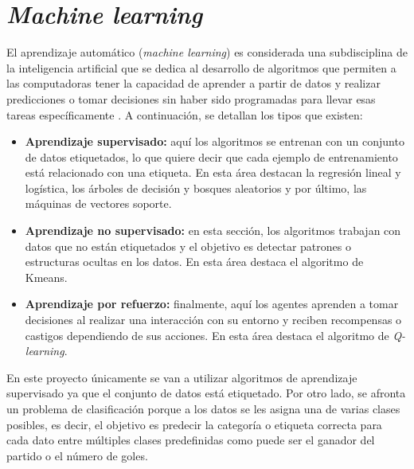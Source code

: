 \section{\textit{Machine learning}}
\label{machine-learning}
El aprendizaje automático (\textit{machine learning}) es considerada una subdisciplina de la inteligencia artificial que se dedica al desarrollo de algoritmos que permiten a las computadoras tener la capacidad de aprender a partir de datos y realizar predicciones o tomar decisiones sin haber sido programadas para llevar esas tareas específicamente \cite{machine-learning}. A continuación, se detallan los tipos que existen:
\begin{itemize}
    \item \textbf{Aprendizaje supervisado:} aquí los algoritmos se entrenan con un conjunto de datos etiquetados, lo que quiere decir que cada ejemplo de entrenamiento está relacionado con una etiqueta. En esta área destacan la regresión lineal y logística, los árboles de decisión y bosques aleatorios y por último, las máquinas de vectores soporte.
    \item \textbf{Aprendizaje no supervisado:} en esta sección, los algoritmos trabajan con datos que no están etiquetados y el objetivo es detectar patrones o estructuras ocultas en los datos. En esta área destaca el algoritmo de Kmeans.
    \item \textbf{Aprendizaje por refuerzo:} finalmente, aquí los agentes aprenden a tomar decisiones al realizar una interacción con su entorno y reciben recompensas o castigos dependiendo de sus acciones. En esta área destaca el algoritmo de \textit{Q-learning}.
\end{itemize}


En este proyecto únicamente se van a utilizar algoritmos de aprendizaje supervisado ya que el conjunto de datos está etiquetado. Por otro lado, se afronta un problema de clasificación porque a los datos se les asigna una de varias clases posibles, es decir, el objetivo es predecir la categoría o etiqueta correcta para cada dato entre múltiples clases predefinidas como puede ser el ganador del partido o el número de goles.

